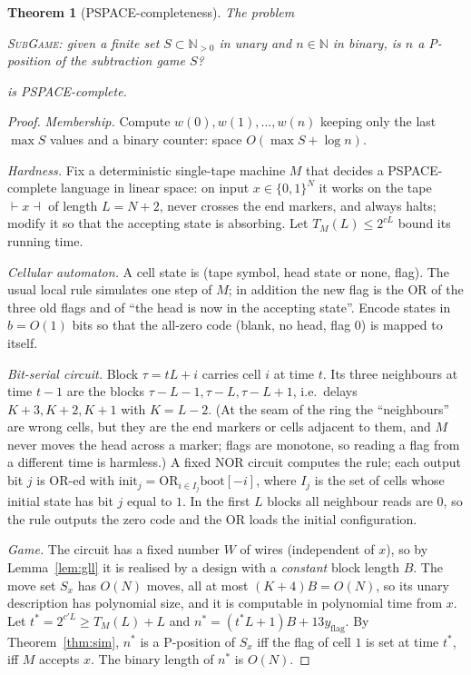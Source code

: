 \documentclass[11pt]{article}
\newtheorem{theorem}{Theorem}
\theoremstyle{definition}
\newcommand{\N}{\mathbb{N}}
\begin{document}
\begin{theorem}[PSPACE-completeness]\label{thm:pspace}
The problem
\begin{center}
\textsc{SubGame}: given a finite set $S\subset\N_{>0}$ in unary and $n\in\N$ in binary, is $n$ a
P-position of the subtraction game $S$?
\end{center}
is PSPACE-complete.
\end{theorem}

\begin{proof}
\emph{Membership.}  Compute $w(0),w(1),\dots,w(n)$ keeping only the last $\max S$ values and a
binary counter: space $O(\max S+\log n)$.

\emph{Hardness.}  Fix a deterministic single-tape machine $M$ that decides a PSPACE-complete language
in linear space: on input $x\in\{0,1\}^N$ it works on the tape $\vdash x\dashv$ of length
$L=N+2$, never crosses the end markers, and always halts; modify it so that the accepting state is
absorbing.  Let $T_M(L)\le 2^{cL}$ bound its running time.

\emph{Cellular automaton.}  A cell state is (tape symbol, head state or none, flag).  The usual local
rule simulates one step of $M$; in addition the new flag is the OR of the three old flags and of
``the head is now in the accepting state''.  Encode states in $b=O(1)$ bits so that the all-zero code
(blank, no head, flag $0$) is mapped to itself.

\emph{Bit-serial circuit.}  Block $\tau=tL+i$ carries cell $i$ at time $t$.  Its three neighbours at
time $t-1$ are the blocks $\tau-L-1,\tau-L,\tau-L+1$, i.e.\ delays $K+3,K+2,K+1$ with $K=L-2$.  (At the
seam of the ring the ``neighbours'' are wrong cells, but they are the end markers or cells adjacent
to them, and $M$ never moves the head across a marker; flags are monotone, so reading a flag from a
different time is harmless.)  A fixed NOR circuit computes the rule; each output bit $j$ is OR-ed
with $\mathrm{init}_j=\mathrm{OR}_{i\in I_j}\mathrm{boot}[-i]$, where $I_j$ is the set of cells whose
initial state has bit $j$ equal to $1$.  In the first $L$ blocks all neighbour reads are $0$, so the
rule outputs the zero code and the OR loads the initial configuration.

\emph{Game.}  The circuit has a fixed number $W$ of wires (independent of $x$), so by
Lemma~\ref{lem:gll} it is realised by a design with a \emph{constant} block length $B$.  The move set
$S_x$ has $O(N)$ moves, all at most $(K+4)B=O(N)$, so its unary description has polynomial size, and
it is computable in polynomial time from $x$.  Let $t^*=2^{c'L}\ge T_M(L)+L$ and
$n^*=(t^*L+1)B+13y_{\mathrm{flag}}$.  By Theorem~\ref{thm:sim}, $n^*$ is a P-position of $S_x$ iff the
flag of cell $1$ is set at time $t^*$, iff $M$ accepts $x$.  The binary length of $n^*$ is $O(N)$.
\end{proof}
\end{document}
